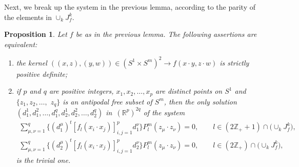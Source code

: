 \documentclass[pdftex]{sigma}
\numberwithin{equation}{section}
\newtheorem{Proposition}[Theorem]{Proposition}
{ \theoremstyle{definition}
\newtheorem{Definition}[Theorem]{Definition}
}
\begin{document}
Next, we break up the system in the previous lemma, according to the parity of the elements in $\cup_{k}J_f^k$.

\begin{Proposition} \label{evenodd}
Let $f$ be as in the previous lemma. The following assertions are equivalent:
\begin{enumerate}\itemsep=0pt
\item[$(i)$] the kernel $((x,z), (y,w)) \in (S^1 \times S^m)^2 \to f(x \cdot y, z \cdot w)$ is strictly positive definite;
\item[$(ii)$] if $p$ and $q$ are positive integers, $x_1,x_2, \ldots, x_p$ are distinct points on $S^1$ and $\{z_1, z_2, \ldots,$ $z_q\}$ is an antipodal free subset of $S^m$, then the only solution $(d_1^1, d_1^2,\ldots, d_1^q, d_2^1,d_2^2, \ldots, d_2^q)$ in~$(\mathbb{R}^{p})^{2q}$ of the system
\begin{gather*}
\sum_{\mu,\nu=1}^q \big\{(d_1^\mu)^t [f_l(x_i \cdot x_j)]_{i,j=1}^p d_1^\nu\big\} P_l^m(z_\mu \cdot z_\nu )=0, \qquad l\in (2\mathbb{Z}_++1) \cap \big(\cup_{k}J_f^k\big),\\
\sum_{\mu,\nu=1}^q \big\{(d_2^\mu)^t [f_l(x_i \cdot x_j)]_{i,j=1}^p d_2^\nu\big\} P_l^m(z_\mu \cdot z_\nu )=0, \qquad l\in (2\mathbb{Z}_+) \cap \big(\cup_{k}J_f^k\big),
\end{gather*}
is the trivial one.
\end{enumerate}
\end{Proposition}
\end{document}
